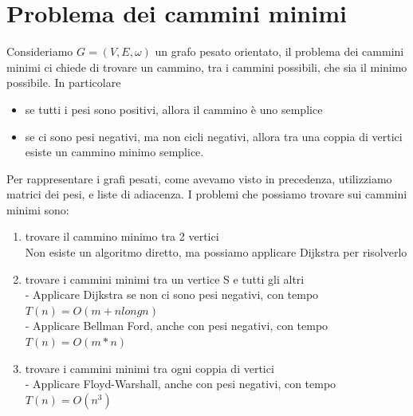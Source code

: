 \documentclass[11pt, oneside]{article}   	%
\begin{document}
\section*{Problema dei cammini minimi}
Consideriamo $G = (V, E,\omega)$ un grafo pesato orientato, il problema dei cammini minimi ci chiede di trovare un cammino, tra i cammini possibili, che sia il minimo possibile. In particolare \begin{itemize}
\item se tutti i pesi sono positivi, allora il cammino è uno semplice
\item se ci sono pesi negativi, ma non cicli negativi, allora tra una coppia di vertici esiste un cammino minimo semplice.
\end{itemize}
Per rappresentare i grafi pesati, come avevamo visto in precedenza, utilizziamo matrici dei pesi, e liste di adiacenza.
I problemi che possiamo trovare sui cammini minimi sono:
\begin{enumerate}
\item trovare il cammino minimo tra 2 vertici \\
Non esiste un algoritmo diretto, ma possiamo applicare Dijkstra per risolverlo 
\item trovare i cammini minimi tra un vertice S e tutti gli altri\\
- Applicare Dijkstra se non ci sono pesi negativi, con tempo $T(n) = O(m + nlongn)$\\
- Applicare Bellman Ford, anche con pesi negativi, con tempo $T(n) = O(m*n)$
\item trovare i cammini minimi tra ogni coppia di vertici\\
- Applicare Floyd-Warshall, anche con pesi negativi, con tempo $T(n) = O(n^3)$
\end{enumerate}
\end{document}
